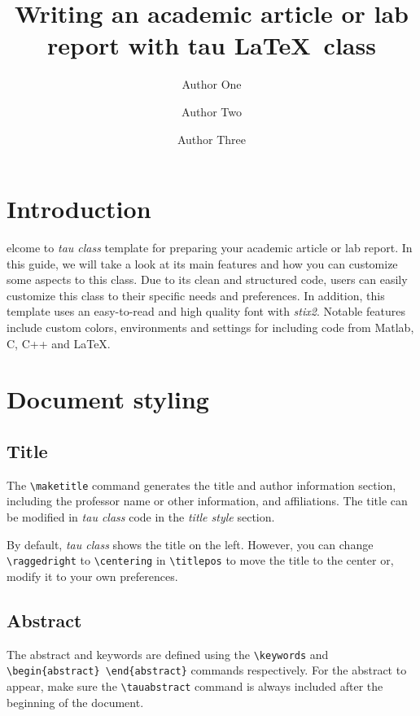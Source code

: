 \documentclass[9pt,a4paper,twoside]{tau}
\title{Writing an academic article or lab report with tau \LaTeX\ class}
\author[a,1]{Author One}
\author[b,2]{Author Two}
\author[b,c,3]{Author Three}
\affil[a]{Affiliation of author one}
\affil[b]{Affiliation of author two}
\affil[c]{Affiliation of author three}
\begin{document}
		
    \maketitle\thispagestyle{firststyle}\tauabstract
    \tableofcontents


\section{Introduction}

    elcome to \textit{tau class} template for preparing your academic article or lab report. In this guide, we will take a look at its main features and how you can customize some aspects to this class. Due to its clean and structured code, users can easily customize this class to their specific needs and preferences. In addition, this template uses an easy-to-read and high quality font with \textit{stix2}. Notable features include custom colors, environments and settings for including code from Matlab, C, C++ and \LaTeX.
    
\section{Document styling}

    \subsection{Title}
	
        The \verb*|\maketitle| command generates the title and author information section, including the professor name or other information, and affiliations. The title can be modified in \textit{tau class} code in the \textit{title style} section. 
 
        By default, \textit{tau class} shows the title on the left. However, you can change \verb*|\raggedright| to \verb*|\centering| in \verb*|\titlepos| to move the title to the center or, modify it to your own preferences.
	
    \subsection{Abstract}
	
        The abstract and keywords are defined using the \verb*|\keywords| and \verb*|\begin{abstract} \end{abstract}| commands respectively. For the abstract to appear, make sure the \verb|\tauabstract| command is always included after the beginning of the document.
\end{document}
